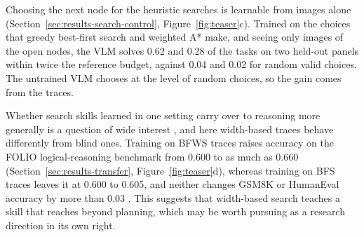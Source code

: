 Choosing the next node for the heuristic searches is learnable from images alone (Section~\ref{sec:results-search-control}, Figure~\ref{fig:teaser}c).
Trained on the choices that greedy best-first search and weighted A* make, and seeing only images of the open nodes, the VLM solves 0.62 and 0.28 of the tasks on two held-out panels within twice the reference budget, against 0.04 and 0.02 for random valid choices.
The untrained VLM chooses at the level of random choices, so the gain comes from the traces.

Whether search skills learned in one setting carry over to reasoning more generally is a question of wide interest \citep{gandhi2024stream,opedal2026learning}, and here width-based traces behave differently from blind ones.
Training on BFWS traces raises accuracy on the FOLIO logical-reasoning benchmark \citep{han2022folio} from 0.600 to as much as 0.660 (Section~\ref{sec:results-transfer}, Figure~\ref{fig:teaser}d), whereas training on BFS traces leaves it at 0.600 to 0.605, and neither changes GSM8K or HumanEval accuracy by more than 0.03 \citep{cobbe2021gsm8k,chen2021humaneval}.
This suggests that width-based search teaches a skill that reaches beyond planning, which may be worth pursuing as a research direction in its own right.

